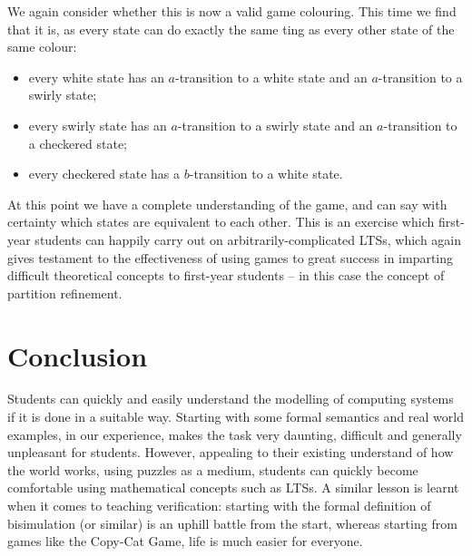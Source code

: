 \documentclass[sigconf]{acmart}
\begin{document}
We again consider whether this is now a valid game colouring.  This
time we find that it is, as every state can do exactly the same ting
as every other state of the same colour:

\begin{itemize}
\item
every white state has an $a$-transition to a white state
and an $a$-transition to a swirly state;
\item
every swirly state has an $a$-transition to a swirly state
and an $a$-transition to a checkered state;
\item
every checkered state has a $b$-transition to a white state.
\end{itemize}

At this point we have a complete understanding of the game, and can
say with certainty which states are equivalent to each other.  This is
an exercise which first-year students can happily carry out on
arbitrarily-complicated LTSs, which again gives testament to the
effectiveness of using games to great success in imparting difficult
theoretical concepts to first-year students -- in this case the
concept of partition refinement.


\section{Conclusion}

Students can quickly and easily understand the modelling of computing
systems if it is done in a suitable way. Starting with some formal
semantics and real world examples, in our experience, makes the task
very daunting, difficult and generally unpleasant for
students. However, appealing to their existing understand of how the
world works, using puzzles as a medium, students can quickly become
comfortable using mathematical concepts such as LTSs. A similar lesson
is learnt when it comes to teaching verification: starting with the
formal definition of bisimulation (or similar) is an uphill battle
from the start, whereas starting from games like the Copy-Cat Game,
life is much easier for everyone.
\end{document}
